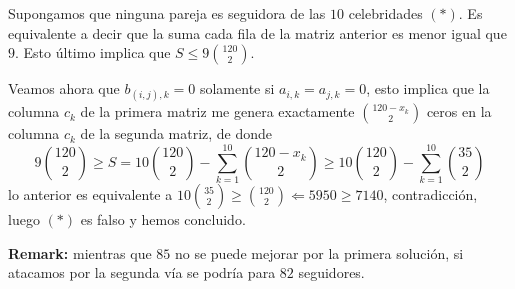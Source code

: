 Supongamos que ninguna pareja es seguidora de las $10$ celebridades $(*)$. Es equivalente a decir que la suma cada fila de la matriz anterior es menor igual que $9$. Esto último implica que $S\le 9{120\choose{2}}$.

Veamos ahora que $b_{(i,j), k}=0$ solamente si $a_{i,k} = a_{j,k} = 0$, esto implica que la columna $c_k$ de la primera matriz me genera exactamente ${120-x_k\choose{2}}$ ceros en la columna $c_k$ de la segunda matriz, de donde
\[
9{120\choose{2}}\ge S = 10{120\choose{2}}- \sum_{k=1}^{10}{120-x_k\choose{2}}\ge  10{120\choose{2}}- \sum_{k=1}^{10}{35\choose{2}}
\]
lo anterior es equivalente a $10{35\choose{2}} \ge {120\choose{2}} \Longleftarrow 5950\ge 7140$, contradicción, luego $(*)$ es falso y hemos concluido.

\textbf{Remark:} mientras que $85$ no se puede mejorar por la primera solución, si atacamos por la segunda vía se podría para $82$ seguidores.

